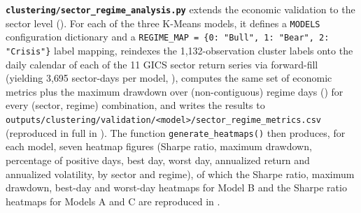 \textbf{\texttt{clustering/sector\_regime\_analysis.py}} extends the
economic validation to the sector level ().
For each of the three K-Means models, it defines a \texttt{MODELS}
configuration dictionary and a \texttt{REGIME\_MAP = \{0: "Bull", 1:
"Bear", 2: "Crisis"\}} label mapping, reindexes the 1{,}132-observation
cluster labels onto the daily calendar of each of the 11 GICS sector return
series via forward-fill (yielding 3{,}695 sector-days per model,
), computes the same set of economic metrics
plus the maximum drawdown over (non-contiguous) regime days
() for every (sector, regime) combination, and writes the
results to \texttt{outputs/clustering/validation/<model>/sector\_regime\_metrics.csv}
(reproduced in full in ). The function
\texttt{generate\_heatmaps()} then produces, for each model, seven heatmap
figures (Sharpe ratio, maximum drawdown, percentage of positive days, best
day, worst day, annualized return and annualized volatility, by sector and
regime), of which the Sharpe ratio, maximum drawdown, best-day and
worst-day heatmaps for Model B and the Sharpe ratio heatmaps for Models A
and C are reproduced in .
